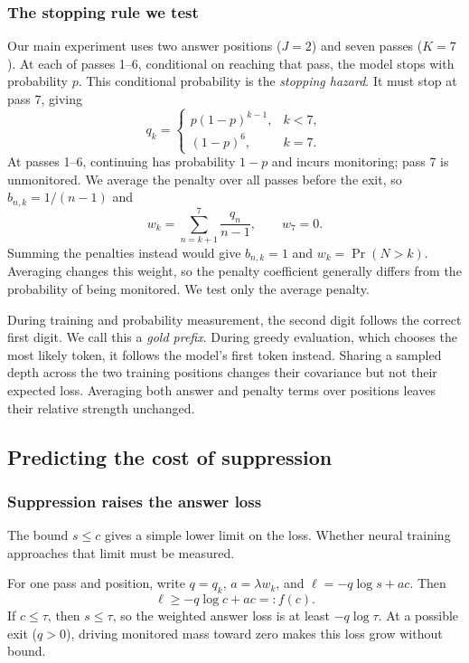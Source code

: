 \subsubsection{The stopping rule we test}
Our main experiment uses two answer positions ($J=2$) and seven passes ($K=7$). At each of passes 1--6, conditional on reaching that pass, the model stops with probability $p$. This conditional probability is the \emph{stopping hazard}. It must stop at pass 7, giving
\begin{equation}
 q_k=
 \begin{cases}p(1-p)^{k-1},&k<7,\\(1-p)^6,&k=7.\end{cases}
 \label{eq:q}
\end{equation}
At passes 1--6, continuing has probability $1-p$ and incurs monitoring; pass 7 is unmonitored. We average the penalty over all passes before the exit, so $b_{n,k}=1/(n-1)$ and
\begin{equation}
 w_k=\sum_{n=k+1}^{7}\frac{q_n}{n-1},\qquad w_7=0.
 \label{eq:w}
\end{equation}
Summing the penalties instead would give $b_{n,k}=1$ and $w_k=\Pr(N>k)$. Averaging changes this weight, so the penalty coefficient generally differs from the probability of being monitored. We test only the average penalty.

During training and probability measurement, the second digit follows the correct first digit. We call this a \emph{gold prefix}. During greedy evaluation, which chooses the most likely token, it follows the model's first token instead. Sharing a sampled depth across the two training positions changes their covariance but not their expected loss. Averaging both answer and penalty terms over positions leaves their relative strength unchanged.

\subsection{Predicting the cost of suppression}
\subsubsection{Suppression raises the answer loss}
The bound $s\le c$ gives a simple lower limit on the loss. Whether neural training approaches that limit must be measured.

For one pass and position, write $q=q_k$, $a=\lambda w_k$, and $\ell=-q\log s+ac$. Then
\begin{equation}
 \ell\ge -q\log c+ac=:f(c).
 \label{eq:bound}
\end{equation}
If $c\le\tau$, then $s\le\tau$, so the weighted answer loss is at least $-q\log\tau$. At a possible exit ($q>0$), driving monitored mass toward zero makes this loss grow without bound.

